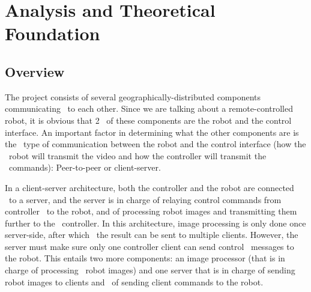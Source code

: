 
\chapter{Analysis and Theoretical Foundation}
\label{ch:analysis}

%
%
%

\section{Overview}
\label{sec:analysis-overview}
The project consists of several geographically-distributed components communicating \
to each other.
Since we are talking about a remote-controlled robot, it is obvious that 2 \
of these components are the robot and the control interface.
An important factor in determining what the other components are is the \
type of communication between the robot and the control interface (how the \
robot will transmit the video and how the controller will transmit the \
commands): Peer-to-peer or client-server.

In a client-server architecture, both the controller and the robot are connected \
to a server, and the server is in charge of relaying control commands from controller \
to the robot, and of processing robot images and transmitting them further to the \
controller.
In this architecture, image processing is only done once server-side, after which \
the result can be sent to multiple clients.
However, the server must make sure  only one controller client can send control \
messages to the robot.
This entails two more components: an image processor (that is in charge of processing \
robot images) and one server that is in charge of sending robot images to clients and \
of sending client commands to the robot.

